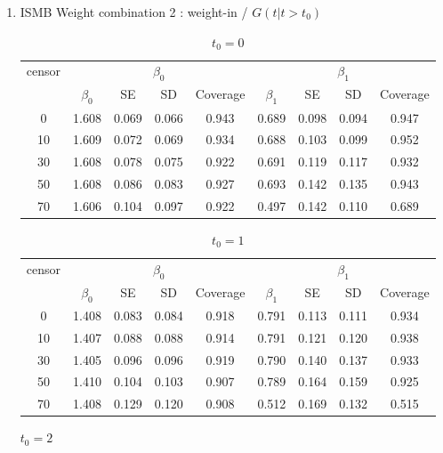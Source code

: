 \documentclass[12pt]{article}
\begin{document}
\begin{enumerate}
			\item {ISMB Weight combination 2 : weight-in / $G(t|t>t_0)$}
		\begin{table}[hbt!]
			\caption{$t_0=0$}
			\centering
			\begin{tabular}{|c|c|c|c|c|c|c|c|c|}
				\hline
				\multirow{2}{*}{censor} & \multicolumn{4}{c|}{$\beta_0$} & \multicolumn{4}{c|}{$\beta_1$}\\ \cline{2-9}
				& $\beta_0$ & SE & SD  & Coverage  & $\beta_1$ & SE & SD & Coverage\\
				\hline\hline
				0 & 1.608 & 0.069 & 0.066 & 0.943 & 0.689 & 0.098 & 0.094 & 0.947 \\ 
  10 & 1.609 & 0.072 & 0.069 & 0.934 & 0.688 & 0.103 & 0.099 & 0.952 \\ 
  30 & 1.608 & 0.078 & 0.075 & 0.922 & 0.691 & 0.119 & 0.117 & 0.932 \\ 
  50 & 1.608 & 0.086 & 0.083 & 0.927 & 0.693 & 0.142 & 0.135 & 0.943 \\ 
  70 & 1.606 & 0.104 & 0.097 & 0.922 & 0.497 & 0.142 & 0.110 & 0.689 \\ 
				\hline
			\end{tabular}
		\end{table}
		\begin{table}[hbt!]
			\caption{$t_0=1$}
			\centering
			\begin{tabular}{|c|c|c|c|c|c|c|c|c|}
				\hline
				\multirow{2}{*}{censor} & \multicolumn{4}{c|}{$\beta_0$} & \multicolumn{4}{c|}{$\beta_1$}\\ \cline{2-9}
				& $\beta_0$ & SE & SD  & Coverage  & $\beta_1$ & SE & SD & Coverage\\
				\hline\hline
				0 & 1.408 & 0.083 & 0.084 & 0.918 & 0.791 & 0.113 & 0.111 & 0.934 \\ 
  10 & 1.407 & 0.088 & 0.088 & 0.914 & 0.791 & 0.121 & 0.120 & 0.938 \\ 
  30 & 1.405 & 0.096 & 0.096 & 0.919 & 0.790 & 0.140 & 0.137 & 0.933 \\ 
  50 & 1.410 & 0.104 & 0.103 & 0.907 & 0.789 & 0.164 & 0.159 & 0.925 \\ 
  70 & 1.408 & 0.129 & 0.120 & 0.908 & 0.512 & 0.169 & 0.132 & 0.515 \\ 
				\hline
			\end{tabular}
		\end{table}
		\begin{table}[hbt!]
			\caption{$t_0=2$}
			\centering
			\begin{tabular}{|c|c|c|c|c|c|c|c|c|}
				\hline

\end{tabular}
\end{table}
\end{enumerate}
\end{document}
